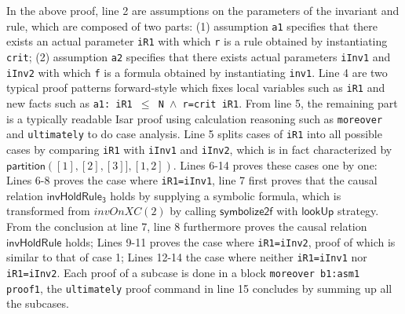\documentclass{llncs}
\def \iInv {iInv}
\def \iR {iR}
\begin{document}
In the above proof, line 2 are assumptions on the parameters of the invariant and rule, which are composed of two parts: (1) assumption {\tt a1} specifies that there exists an actual parameter {\tt \iR1} with which {\tt r} is a rule obtained by instantiating {\tt crit}; (2) assumption {\tt a2} specifies that  there exists   actual parameters {\tt \iInv1} and {\tt \iInv2} with which {\tt f} is a formula obtained by instantiating {\tt inv1}.
Line 4 are two typical  proof patterns forward-style which fixes local variables such as {\tt \iR1} and new facts such as {\tt a1: iR1 $\le$ N $\wedge$ r=crit \iR1}. From line 5, the remaining part  is a typically readable Isar proof using calculation
reasoning such as {\tt moreover} and {\tt ultimately} to do  case analysis.
Line 5 splits cases of {\tt iR1} into all possible cases by comparing
{\tt \iR1} with {\tt \iInv1} and {\tt \iInv2}, which is in fact characterized by $\mathsf{partition}([1],[2],[3]],[1,2])$. Lines 6-14  proves    these cases one by one: Lines 6-8 proves the case where {\tt iR1=\iInv1}, line 7 first proves that the causal relation $\mathsf{invHoldRule_3}$ holds by supplying a symbolic formula, which is transformed from $invOnXC(2)$  by calling $\mathsf{symbolize2f}$ with $\mathsf{lookUp}$ strategy.  %
From the conclusion at line 7, line 8 furthermore proves the causal relation $\mathsf{invHoldRule}$  holds; Lines 9-11 proves the case where {\tt iR1=\iInv2}, proof of which is similar to that of case 1; Lines 12-14 the case   where neither {\tt iR1=\iInv1} nor {\tt iR1=\iInv2}. Each proof of a subcase is done in a block {\tt moreover b1:asm1 proof1}, the {\tt ultimately}  proof command in line 15 concludes by summing up all the subcases.
\end{document}
